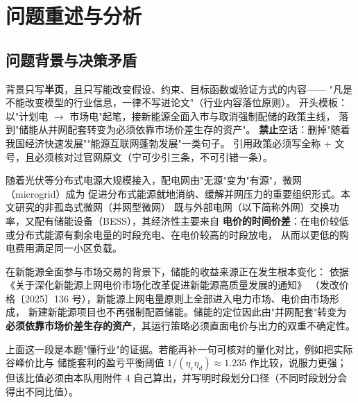 
\section{问题重述与分析}

\subsection{问题背景与决策矛盾}

\begin{guideblock}
背景只写\textbf{半页}，且只写能改变假设、约束、目标函数或验证方式的内容——
"凡是不能改变模型的行业信息，一律不写进论文"（行业内容落位原则）。
开头模板：以"计划电 \(\rightarrow\) 市场电"起笔，接新能源全面入市与取消强制配储的政策主线，
落到"储能从并网配套转变为必须依靠市场价差生存的资产"。
\textbf{禁止}空话：删掉"随着我国经济快速发展""能源互联网蓬勃发展"一类句子。
引用政策必须写全称 + 文号，且必须核对过官网原文（宁可少引三条，不可引错一条）。
\end{guideblock}

随着光伏等分布式电源大规模接入，配电网由"无源"变为"有源"，微网（microgrid）成为
促进分布式能源就地消纳、缓解并网压力的重要组织形式。本文研究的非孤岛式微网（并网型微网）
既与外部电网（以下简称外网）交换功率，又配有储能设备（BESS），其经济性主要来自
\textbf{电价的时间价差}：在电价较低或分布式能源有剩余电量的时段充电、在电价较高的时段放电，
从而以更低的购电费用满足同一小区负载。

在新能源全面参与市场交易的背景下\cite{ref136}，储能的收益来源正在发生根本变化：
依据《关于深化新能源上网电价市场化改革促进新能源高质量发展的通知》
（发改价格〔2025〕136 号），新能源上网电量原则上全部进入电力市场、电价由市场形成，
新建新能源项目也不再强制配置储能。储能的定位因此由"并网配套"转变为
\textbf{必须依靠市场价差生存的资产}，其运行策略必须直面电价与出力的双重不确定性。
\begin{guideblock}
上面这一段是本题"懂行业"的证据。若能再补一句可核对的量化对比，例如把实际谷峰价比与
储能套利的盈亏平衡阈值 \(1/(\eta_c\eta_d)\approx 1.235\) 作比较，说服力更强；
但该比值必须由本队用附件 4 自己算出，并写明时段划分口径（不同时段划分会得出不同比值）。
\end{guideblock}

